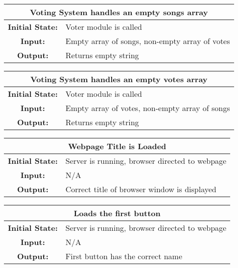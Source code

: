 \documentclass[12pt, titlepage]{article}
\begin{document}
\begin{center}
\begin{table}[H]
\begin{tabularx}{\textwidth}{| c X |}
\hline
\multicolumn{2}{|c|}{\textbf{Voting System handles an empty songs array}}\\
\hline
\textbf{Initial State: } & Voter module is called\\
\textbf{Input: } & Empty array of songs, non-empty array of votes\\
\textbf{Output: } & Returns empty string\\
\hline
\end{tabularx}
\end{table}
\end{center}


\begin{center}
\begin{table}[H]
\begin{tabularx}{\textwidth}{| c X |}
\hline
\multicolumn{2}{|c|}{\textbf{Voting System handles an empty votes array}}\\
\hline
\textbf{Initial State: } & Voter module is called\\
\textbf{Input: } & Empty array of votes, non-empty array of songs\\
\textbf{Output: } & Returns empty string\\
\hline
\end{tabularx}
\end{table}
\end{center}


\begin{center}
\begin{table}[H]
\begin{tabularx}{\textwidth}{| c X |}
\hline
\multicolumn{2}{|c|}{\textbf{Webpage Title is Loaded}}\\
\hline
\textbf{Initial State: } & Server is running, browser directed to webpage\\
\textbf{Input: } & N/A\\
\textbf{Output: } & Correct title of browser window is displayed\\
\hline
\end{tabularx}
\end{table}
\end{center}


\begin{center}
\begin{table}[H]
\begin{tabularx}{\textwidth}{| c X |}
\hline
\multicolumn{2}{|c|}{\textbf{Loads the first button}}\\
\hline
\textbf{Initial State: } & Server is running, browser directed to webpage\\
\textbf{Input: } & N/A\\
\textbf{Output: } & First button has the correct name\\
\hline
\end{tabularx}
\end{table}
\end{center}
\end{document}

